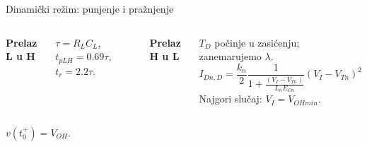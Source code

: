 \begin{frame}[label=09_1-s028]{Dinamički režim: punjenje i pražnjenje}\setlength{\parskip}{2pt}\setlength{\abovedisplayskip}{4pt}\setlength{\belowdisplayskip}{4pt}\setlength{\abovedisplayshortskip}{3pt}\setlength{\belowdisplayshortskip}{3pt}
\begin{columns}[T,onlytextwidth]\textbf{Prelaz L u H}\par $\tau=R_LC_L$, $t_{pLH}=0.69\tau$, $t_r=2.2\tau$.\par\medskip
\centering {}\textbf{Prelaz H u L}\par $T_D$ počinje u zasićenju; zanemarujemo $\lambda$.\[I_{Dn,D}=\frac{k_n}{2}\frac1{1+\frac{(V_I-V_{Tn})}{L_nE_{Cn}}}(V_I-V_{Tn})^2\]
Najgori slučaj: $V_I=V_{OHmin}$.\par\centering \end{columns}\par $v(t_0^+)=V_{OH}$.


\end{frame}

